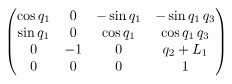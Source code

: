 $$\ifx\endpmatrix\undefined\pmatrix{\else\begin{pmatrix}\fi \cos 
 q_{1}&0&-\sin q_{1}&-\sin q_{1}\,q_{3}\cr \sin q_{1}&0&\cos q_{1}&
 \cos q_{1}\,q_{3}\cr 0&-1&0&q_{2}+L_{1}\cr 0&0&0&1\cr 
 \ifx\endpmatrix\undefined}\else\end{pmatrix}\fi $$
